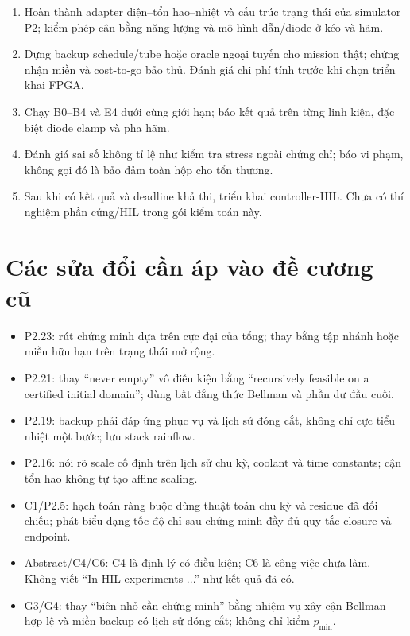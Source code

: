 \documentclass[11pt,a4paper]{article}
\begin{document}
\begin{enumerate}
\item Hoàn thành adapter điện--tổn hao--nhiệt và cấu trúc trạng thái của simulator P2; kiểm phép cân bằng năng lượng và mô hình dẫn/diode ở kéo và hãm.
\item Dựng backup schedule/tube hoặc oracle ngoại tuyến cho mission thật; chứng nhận miền và cost-to-go bảo thủ. Đánh giá chi phí tính trước khi chọn triển khai FPGA.
\item Chạy B0--B4 và E4 dưới cùng giới hạn; báo kết quả trên từng linh kiện, đặc biệt diode clamp và pha hãm.
\item Đánh giá sai số không tỉ lệ như kiểm tra stress ngoài chứng chỉ; báo vi phạm, không gọi đó là bảo đảm toàn hộp cho tổn thương.
\item Sau khi có kết quả và deadline khả thi, triển khai controller-HIL. Chưa có thí nghiệm phần cứng/HIL trong gói kiểm toán này.
\end{enumerate}

\section{Các sửa đổi cần áp vào đề cương cũ}
\begin{itemize}
\item P2.23: rút chứng minh dựa trên cực đại của tổng; thay bằng tập nhánh hoặc miền hữu hạn trên trạng thái mở rộng.
\item P2.21: thay ``never empty'' vô điều kiện bằng ``recursively feasible on a certified initial domain''; dùng bất đẳng thức Bellman và phần dư đầu cuối.
\item P2.19: backup phải đáp ứng phục vụ và lịch sử đóng cắt, không chỉ cực tiểu nhiệt một bước; lưu stack rainflow.
\item P2.16: nói rõ scale cố định trên lịch sử chu kỳ, coolant và time constants; cận tổn hao không tự tạo affine scaling.
\item C1/P2.5: hạch toán ràng buộc dùng thuật toán chu kỳ và residue đã đối chiếu; phát biểu dạng tốc độ chỉ sau chứng minh đầy đủ quy tắc closure và endpoint.
\item Abstract/C4/C6: C4 là định lý có điều kiện; C6 là công việc chưa làm. Không viết ``In HIL experiments ...'' như kết quả đã có.
\item G3/G4: thay ``biên nhỏ cần chứng minh'' bằng nhiệm vụ xây cận Bellman hợp lệ và miền backup có lịch sử đóng cắt; không chỉ kiểm $p_{\min}$.
\end{itemize}
\end{document}
